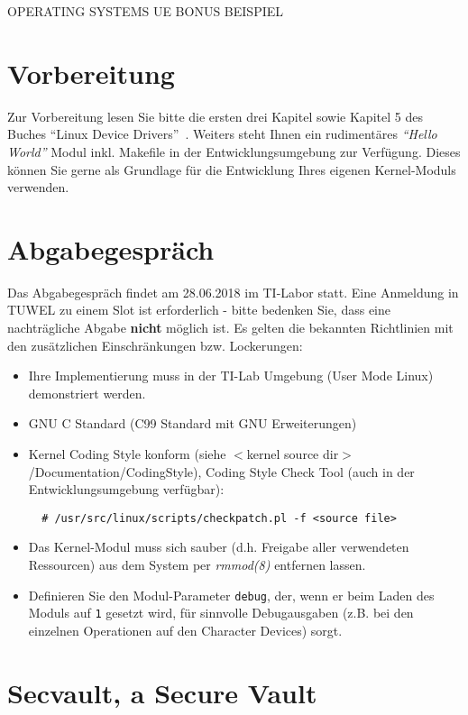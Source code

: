 \documentclass{article}
\begin{document}
\begin{center}
\begin{Large}
OPERATING SYSTEMS UE BONUS BEISPIEL
\end{Large}
\end{center}


\section*{Vorbereitung}
Zur Vorbereitung lesen Sie bitte die ersten drei Kapitel sowie Kapitel
5 des Buches "`Linux Device
Drivers"'~\cite{Corbet:2005:LDD:1209083}. Weiters steht Ihnen ein
rudiment{\"a}res \emph{"`Hello World"'} Modul inkl. Makefile in
der Entwicklungsumgebung zur Verf{\"u}gung. Dieses k{\"o}nnen Sie gerne als
Grundlage f{\"u}r die Entwicklung Ihres eigenen Kernel-Moduls
verwenden.

\section*{Abgabegespr{\"a}ch}
Das Abgabegespr{\"a}ch findet am 28.06.2018 im TI-Labor statt.
Eine Anmeldung in TUWEL zu einem Slot ist erforderlich -
bitte bedenken Sie, dass eine nachtr{\"a}gliche Abgabe {\bf nicht}
m{\"o}glich ist. Es gelten die
bekannten Richtlinien mit den zus{\"a}tzlichen Einschr{\"a}nkungen
bzw. Lockerungen:
\begin{itemize}
\item Ihre Implementierung muss in der TI-Lab Umgebung (User Mode Linux) demonstriert werden.
\item GNU C Standard (C99 Standard mit GNU Erweiterungen)
\item Kernel Coding Style konform (siehe $<$kernel source
  dir$>$/Documentation/CodingStyle), Coding Style Check Tool
  (auch in der Entwicklungsumgebung verf{\"u}gbar):
  \begin{verbatim}
  # /usr/src/linux/scripts/checkpatch.pl -f <source file>
  \end{verbatim}
\item Das Kernel-Modul muss sich sauber (d.h. Freigabe aller
  verwendeten Ressourcen) aus dem System per \emph{rmmod(8)} entfernen lassen.
\item Definieren Sie den Modul-Parameter \verb|debug|, der, wenn er beim Laden des Moduls auf \texttt{1} gesetzt wird, f{\"u}r sinnvolle Debugausgaben (z.B. bei den einzelnen Operationen auf den Character Devices) sorgt.
\end{itemize}

\section*{Secvault, a Secure Vault}
\end{document}
